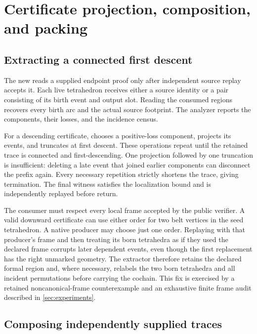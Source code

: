 \section{Certificate projection, composition, and packing}\label{sec:certificate-tools}

\subsection{Extracting a connected first descent}

The new  reads a supplied endpoint proof only
after independent source replay accepts it. Each live tetrahedron receives
either a source identity or a pair consisting of its birth event and output
slot. Reading the consumed regions recovers every birth arc and the actual
source footprint. The analyzer reports the components, their losses, and
the incidence census.

For a descending certificate,  chooses a
positive-loss component, projects its events, and truncates at first
descent. These operations repeat until the retained trace is connected
and first-descending. One projection followed by one truncation is
insufficient: deleting a late event that joined earlier components can
disconnect the prefix again. Every necessary repetition strictly shortens
the trace, giving termination. The final witness satisfies the localization
bound and is independently replayed before return.

The consumer must respect every local frame accepted by the public verifier.
A valid downward certificate can use either order for two belt vertices in
the seed tetrahedron. A native producer may choose just one order. Replaying
with that producer's frame and then treating its born tetrahedra as if they
used the declared frame corrupts later dependent events, even though the
first replacement has the right unmarked geometry. The extractor therefore
retains the declared formal region and, where necessary, relabels the two
born tetrahedra and all incident permutations before carrying the cochain.
This fix is exercised by a retained noncanonical-frame counterexample and
an exhaustive finite frame audit described in \cref{sec:experiments}.

\subsection{Composing independently supplied traces}

